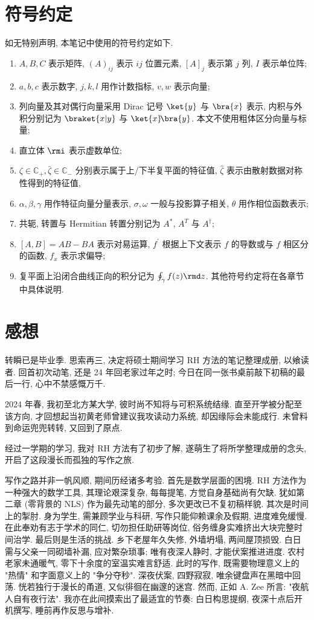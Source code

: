 \section*{符号约定}
如无特别声明, 本笔记中使用的符号约定如下.
\begin{enumerate}
    \item $A, B, C$ 表示矩阵, $(A)_{ij}$ 表示 $ij$ 位置元素, $[A]_{j}$ 表示第 $j$ 列, $I$ 表示单位阵;
    \item $a, b, c$ 表示数字, $j, k, l$ 用作计数指标, $v,w$ 表示向量;
    \item 列向量及其对偶行向量采用 Dirac 记号 $\ket{y}$ 与 $\bra{x}$ 表示, 内积与外积分别记为 $\braket{x|y}$ 与 $\ket{x}\!\bra{y}$. 本文不使用粗体区分向量与标量;
    \item 直立体 $\rmi$ 表示虚数单位;
    \item $\zeta \in \mathbb{C}_{+}, \bar{\zeta} \in \mathbb{C}_{-}$ 分别表示属于上/下半复平面的特征值, $\hat{\zeta}$ 表示由散射数据对称性得到的特征值,
    \item $\alpha, \beta, \gamma$ 用作特征向量分量表示, $\sigma, \omega$ 一般与投影算子相关, $\theta$ 用作相位函数表示;
    \item 共轭, 转置与 Hermitian 转置分别记为 $A^{*}$, $A^{T}$ 与 $A^{\dagger}$;
    \item $[A, B] = AB - BA$ 表示对易运算, $f^{\prime}$ 根据上下文表示 $f$ 的导数或与 $f$ 相区分的函数, $f_{x}$ 表示求偏导;
    \item 复平面上沿闭合曲线正向的积分记为 $\oint_{\gamma} f(z) \rmd z$. 其他符号约定将在各章节中具体说明.
\end{enumerate}

\section*{感想}
转瞬已是毕业季. 思索再三, 决定将硕士期间学习 RH 方法的笔记整理成册, 以飨读者. 回首初次动笔, 还是 24 年回老家过年之时; 今日在同一张书桌前敲下初稿的最后一行, 心中不禁感慨万千.

2024 年春, 我初至北方某大学, 彼时尚不知将与可积系统结缘. 直至开学被分配至该方向, 才回想起当初黄老师曾建议我攻读动力系统, 却因缘际会未能成行. 未曾料到命运兜兜转转, 又回到了原点.

经过一学期的学习, 我对 RH 方法有了初步了解, 遂萌生了将所学整理成册的念头, 开启了这段漫长而孤独的写作之旅.

写作之路并非一帆风顺, 期间历经诸多考验. 首先是数学层面的困境. RH 方法作为一种强大的数学工具, 其理论艰深复杂, 每每提笔, 方觉自身基础尚有欠缺. 犹如第二章 (零背景的 NLS) 作为最先动笔的部分, 多次更改已不复初稿样貌. 其次是时间上的掣肘. 身为学生, 需兼顾学业与科研, 写作只能仰赖课余及假期, 进度难免缓慢. 在此奉劝有志于学术的同仁, 切勿担任助研等岗位, 俗务缠身实难挤出大块完整时间治学. 最后则是生活的挑战. 乡下老屋年久失修, 外墙坍塌, 两间屋顶损毁. 白日需与父亲一同砌墙补漏, 应对繁杂琐事; 唯有夜深人静时, 才能伏案推进进度. 农村老家未通暖气, 零下十余度的室温实难言舒适. 此时的写作, 既需要物理意义上的 "热情" 和字面意义上的 "争分夺秒". 深夜伏案, 四野寂寂, 唯余键盘声在黑暗中回荡. 恍若独行于漫长的甬道, 又似徘徊在幽邃的迷宫. 然而, 正如 A. Zee 所言: "夜航人自有夜行法". 我亦在此间摸索出了最适宜的节奏: 白日构思提纲, 夜深十点后开机撰写, 睡前再作反思与增补.

